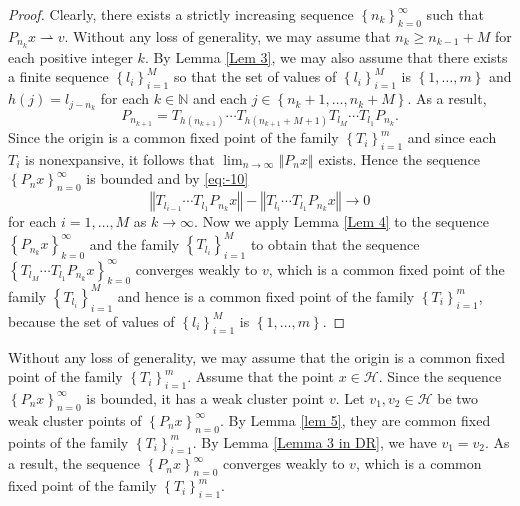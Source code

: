 \documentclass[]{interact}
\theoremstyle{plain}%
\theoremstyle{definition}
\theoremstyle{remark}
\begin{document}
\begin{proof}
Clearly, there exists a strictly increasing sequence $\left\{ n_{k}\right\} _{k=0}^{\infty}$
such that $P_{n_{k}}x\rightharpoonup v$. Without any loss of generality,
we may assume that $n_{k}\ge n_{k-1}+M$ for each positive integer $k$.
By Lemma \ref{Lem 3}, \color{black} we may also assume that \color{black} there exists a finite sequence $\left\{ l_{i}\right\} _{i=1}^{M}$
so that the set of values of $\left\{ l_{i}\right\} _{i=1}^{M}$ is
$\left\{ 1,\dots,m\right\}$ and $h\left(j\right)=l_{j-n_{k}}$ for
each $k\in\mathbb{N}$ and each $j\in\left\{ n_{k}+1,\dots,n_{k}+M\right\}$.
As a result,
\begin{equation}
P_{n_{k+1}}=T_{h\left(n_{k+1}\right)}\cdots T_{h\left(n_{k+1}+M+1\right)}T_{l_{M}}\cdots T_{l_{1}}P_{n_{k}}.\label{eq:-10}
\end{equation}
Since the origin is a common fixed point of the family $\left\{ T_{i}\right\} _{i=1}^{m}$
and since each $T_{i}$ is nonexpansive, it follows that $\lim_{n\rightarrow\infty}\left\Vert P_{n}x\right\Vert$
exists. \color{black} Hence the sequence $\left\{ P_{n}x\right\} _{n=0}^{\infty}$ is bounded and by \eqref{eq:-10} \color{black}
\[
\left\Vert T_{l_{i-1}}\cdots T_{l_{1}}P_{n_{k}}x\right\Vert -\left\Vert T_{l_{i}}\cdots T_{l_{1}}P_{n_{k}}x\right\Vert \rightarrow0
\]
for each $i=1,\dots,M$ as $k\rightarrow\infty$.  Now we apply Lemma \ref{Lem 4}
to the sequence $\left\{ P_{n_{k}}x\right\} _{k=0}^{\infty}$ and
the family $\left\{ T_{l_{i}}\right\} _{i=1}^{M}$ to obtain that
the sequence $\left\{ T_{l_{M}}\cdots T_{l_{1}}P_{n_{k}}x\right\} _{k=0}^{\infty}$
converges weakly to $v$, which is a common fixed point of the family
$\left\{ T_{l_{i}}\right\} _{i=1}^{M}$ and hence is a common fixed
point of the family $\left\{ T_{i}\right\} _{i=1}^{m}$, because the
set of values of $\left\{ l_{i}\right\} _{i=1}^{M}$ is $\left\{ 1,\dots,m\right\}$.
\end{proof}
\makeatletter \renewenvironment{proof}[1][\proofname\space of Theorem \ref{thm6 in DR}] {\par\pushQED{\qed}\normalfont\topsep6\p@\@plus6\p@\relax\trivlist\item[\hskip\labelsep\bfseries#1\@addpunct{.}]\ignorespaces}{\popQED\endtrivlist\@endpefalse} \makeatother
\begin{proof}
Without any loss of generality, we may assume that the origin is a common
fixed point of the family $\left\{ T_{i}\right\} _{i=1}^{m}$. Assume
that the point $x\in\mathcal{H}$. Since the sequence $\left\{ P_{n}x\right\} _{n=0}^{\infty}$
is bounded, it has a weak cluster point $v$. Let $v_{1},v_{2}\in\mathcal{H}$
be two weak cluster points of $\left\{ P_{n}x\right\} _{n=0}^{\infty}$.
By Lemma \ref{lem 5}, they are common fixed points of the family
$\left\{ T_{i}\right\} _{i=1}^{m}$. By Lemma \ref{Lemma 3 in DR},
we have $v_{1}=v_{2}$. As a result, the sequence $\left\{ P_{n}x\right\} _{n=0}^{\infty}$
converges weakly to $v$, which is a common fixed point of the family
$\left\{ T_{i}\right\} _{i=1}^{m}$.
\end{proof}
\end{document}
